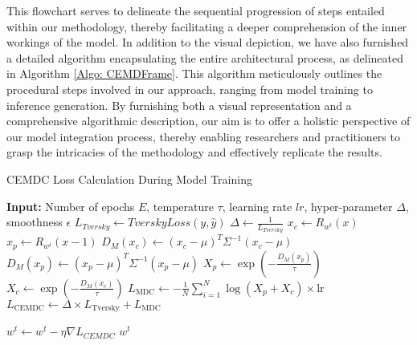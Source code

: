 This flowchart serves to delineate the sequential progression of steps entailed within our methodology, thereby facilitating a deeper comprehension of the inner workings of the model. In addition to the visual depiction, we have also furnished a detailed algorithm encapsulating the entire architectural process, as delineated in Algorithm \ref{Algo: CEMDFrame}. This algorithm meticulously outlines the procedural steps involved in our approach, ranging from model training to inference generation. By furnishing both a visual representation and a comprehensive algorithmic description, our aim is to offer a holistic perspective of our model integration process, thereby enabling researchers and practitioners to grasp the intricacies of the methodology and effectively replicate the results.

\begin{algorithm}[h]
\caption{CEMDC Loss Calculation During Model Training}
\label{Algo: CEMDFrame}
\begin{algorithmic}[1]
\State \textbf{Input:} Number of epochs $E$, temperature $\tau$, learning rate $lr$, hyper-parameter $\Delta$, smoothness $\epsilon$ 
        \State $L_{Tversky} \leftarrow TverskyLoss(y,\hat{y})$
        \State $\Delta \leftarrow \frac{1}{L_{Tversky}}$
        \State $x_c \leftarrow R_{w^t}(x)$
        \State $x_p \leftarrow R_{w^{t}}(x-1)$
        \State $D_M(x_c) \leftarrow (x_c - \mu)^T \Sigma^{-1} (x_c - \mu) $
        \State $D_M(x_p) \leftarrow (x_p - \mu)^T \Sigma^{-1} (x_p - \mu) $
        \State $X_p \leftarrow \exp\left(-\frac{D_M(x_p)}{\tau}\right) $
        \State $X_c \leftarrow \exp\left(-\frac{D_M(x_c)}{\tau}\right)$
        \State $L_{\text{MDC}} \leftarrow -\frac{1}{N} \sum_{i=1}^{N} \log\left( X_p + X_c\right) \times \text{lr}$
        \State $L_{\text{CEMDC}} \leftarrow \Delta \times L_{\text{Tversky}} + L_{\text{MDC}}$
        
        \State$w^t \leftarrow w^t - \eta \nabla L_{CEMDC}$
    \EndFor
\EndFor
\State \Return $w^t$
\end{algorithmic}
\end{algorithm}

